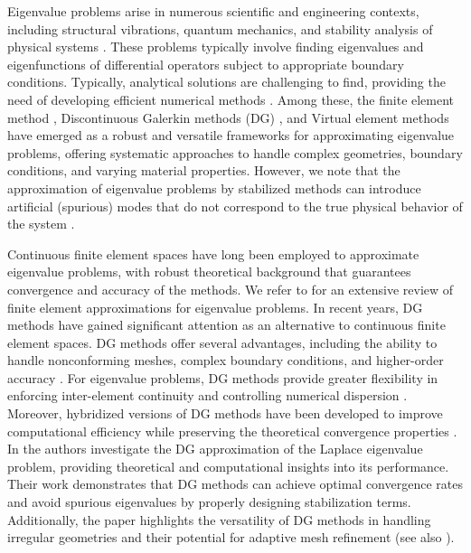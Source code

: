 \documentclass[onefignum,onetabnum,final]{siamart250211}
\numberwithin{equation}{section}
\newcommand\0{\boldsymbol{0}}
\begin{document}
	Eigenvalue problems arise in numerous scientific and engineering contexts, including structural vibrations, quantum mechanics, and stability analysis of physical systems  \cite{rannacher1979nonconforming,bermudez1995finite,csendes1970numerical,davies1982finite,bossavit1990solving}. These problems typically involve finding eigenvalues and eigenfunctions of differential operators subject to appropriate boundary conditions. Typically, analytical solutions are challenging to find, providing the need of developing efficient numerical methods \cite{MR2652780,SUN-BOOK}. Among these,
	the finite element method \cite{BO,MR2652780}, Discontinuous Galerkin methods (DG) \cite{antonietti2006discontinuous,Buffa}, and Virtual element methods \cite{meng2020virtual,MV2020,MRR1} have emerged as a robust and versatile frameworks for approximating eigenvalue problems, offering systematic approaches to handle complex geometries, boundary conditions, and varying material properties. However, we note that the approximation
	of eigenvalue problems by stabilized methods can introduce artificial (spurious)
	modes that do not correspond to the true physical behavior of the system \cite{boffi2020approximation}.
	

	Continuous finite element spaces have long been employed to approximate eigenvalue problems, with robust theoretical background that guarantees convergence and accuracy of the methods. We refer to \cite{SUN-BOOK,MR2652780} for an extensive review of finite element approximations for eigenvalue problems. In recent years, DG methods have gained significant attention as an alternative to continuous finite element spaces. DG methods offer several advantages, including the ability to handle nonconforming meshes, complex boundary conditions, and higher-order accuracy \cite{arnold2002unified, riviere2008discontinuous}. For eigenvalue problems, DG methods provide greater flexibility in enforcing inter-element continuity and controlling numerical dispersion \cite{hesthaven2007nodal, houston2004mixed}. Moreover, hybridized versions of DG methods have been developed to improve computational efficiency while preserving the theoretical convergence properties \cite{cockburn2009}. In \cite{antonietti2006discontinuous} the authors investigate the DG approximation of the Laplace eigenvalue problem, providing theoretical and computational insights into its performance. Their work demonstrates that DG methods can achieve optimal convergence rates and avoid spurious eigenvalues by properly designing stabilization terms. Additionally, the paper highlights the versatility of DG methods in handling irregular geometries and their potential for adaptive mesh refinement (see also \cite{Buffa,MR3962898,LMSisc2020}).
	
\end{document}
